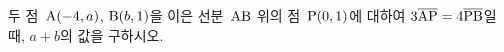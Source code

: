 두 점~$\mathrm{A}(-4{,}\mkern3mu\mathopen{}a)$, $\mathrm{B}(b{,}\mkern3mu\mathopen{}1)$을 이은 선분~$\mathrm{AB}$ 위의 점~$\mathrm{P}(0{,}\mkern3mu\mathopen{}1)$에 대하여 $3\overline{\mathrm{AP}}=4\overline{\mathrm{PB}}$일 때, $a+b$의 값을 구하시오.
